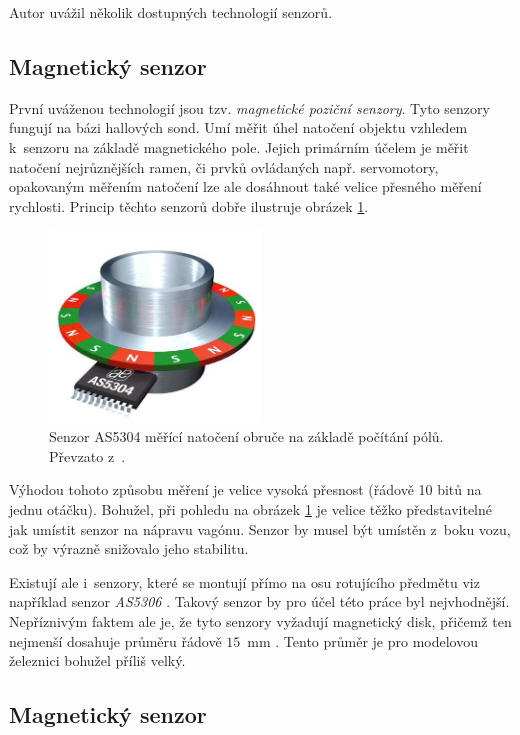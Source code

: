 Autor uvážil několik dostupných technologií senzorů.

\subsection{Magnetický senzor}
\label{subsec:wsm-senzor-mag}

První uváženou technologií jsou tzv. \textit{magnetické poziční senzory}.
Tyto senzory fungují na bázi hallových sond. Umí měřit úhel natočení objektu
vzhledem k~senzoru na základě magnetického pole. Jejich primárním účelem je
měřit natočení nejrůznějších ramen, či prvků ovládaných např. servomotory,
opakovaným měřením natočení lze ale dosáhnout také velice přesného měření
rychlosti. Princip těchto senzorů dobře ilustruje obrázek
\ref{fig:magnetic-sensor}.

\begin{figure}[h]
\includegraphics[width=0.5\textwidth]{data/magnetic_sensor.png}
\caption{Senzor AS5304 měřící natočení obruče na základě počítání pólů. Převzato
z~\cite{as5306}.}
\label{fig:magnetic-sensor}
\end{figure}

Výhodou tohoto způsobu měření je velice vysoká přesnost (řádově 10 bitů na
jednu otáčku). Bohužel, při pohledu na obrázek \ref{fig:magnetic-sensor} je
velice těžko představitelné jak umístit senzor na nápravu vagónu. Senzor by
musel být umístěn z~boku vozu, což by výrazně snižovalo jeho stabilitu.

Existují ale i~senzory, které se montují přímo na osu rotujícího předmětu viz
například senzor \textit{AS5306} \cite{as5306}. Takový senzor by pro účel této
práce byl nejvhodnější. Nepříznivým faktem ale je, že tyto senzory vyžadují
magnetický disk, přičemž ten nejmenší dosahuje průměru řádově $15$~mm
\cite{magnets}. Tento průměr je pro modelovou železnici bohužel příliš velký.

\subsection{Magnetický senzor }
\label{subsec:wsm-senzor-cyclo}

